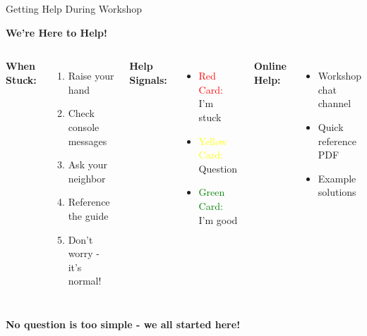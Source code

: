 \documentclass[aspectratio=169,11pt]{beamer}
\begin{document}
\begin{frame}{Getting Help During Workshop}
\begin{center}
\Large\textbf{We're Here to Help!}
\end{center}
\vspace{1em}
\begin{columns}
\textbf{When Stuck:}
\begin{enumerate}
    \item Raise your hand
    \item Check console messages
    \item Ask your neighbor
    \item Reference the guide
    \item Don't worry - it's normal!
\end{enumerate}

\textbf{Help Signals:}
\begin{itemize}
    \item \textcolor{red}{Red Card:} I'm stuck
    \item \textcolor{yellow}{Yellow Card:} Question
    \item \textcolor{green}{Green Card:} I'm good
\end{itemize}
\vspace{1em}
\textbf{Online Help:}
\begin{itemize}
    \item Workshop chat channel
    \item Quick reference PDF
    \item Example solutions
\end{itemize}
\end{columns}
\vspace{1em}
\begin{center}\colorbox{yellow!20}{\parbox{0.9\textwidth}{
\centering
\large\textbf{No question is too simple - we all started here!}
}}\end{center}
\end{frame}
\end{document}
